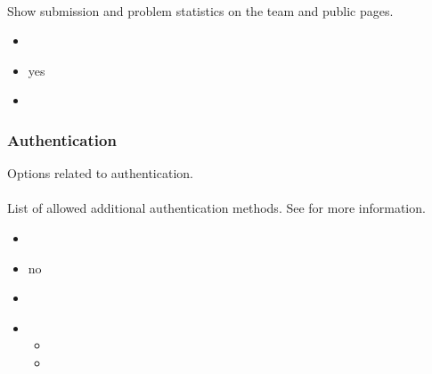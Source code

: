 \documentclass[a4paper,10pt,english,openany]{sphinxmanual}
\begin{document}
\paragraph{}
\label{\detokenize{configuration-reference:show-public-stats}}
\sphinxAtStartPar
Show submission and problem statistics on the team and public pages.
\begin{itemize}
\item {} 
\sphinxAtStartPar
{} 

\item {} 
\sphinxAtStartPar
{} yes

\item {} 
\sphinxAtStartPar
{} 

\end{itemize}


\subsubsection{Authentication}
\label{\detokenize{configuration-reference:authentication}}
\sphinxAtStartPar
Options related to authentication.


\paragraph{}
\label{\detokenize{configuration-reference:auth-methods}}
\sphinxAtStartPar
List of allowed additional authentication methods. See {\hyperref[\detokenize{config-advanced:authentication}]{}} for more information.
\begin{itemize}
\item {} 
\sphinxAtStartPar
{} 

\item {} 
\sphinxAtStartPar
{} no

\item {} 
\sphinxAtStartPar
{}

\begin{sphinxVerbatim}[commandchars=\\\{\}]
\end{sphinxVerbatim}

\item {} 
\sphinxAtStartPar
{}
\begin{itemize}
\item {} 
\sphinxAtStartPar
{}

\item {} 
\sphinxAtStartPar
{}

\end{itemize}

\end{itemize}
\end{document}
